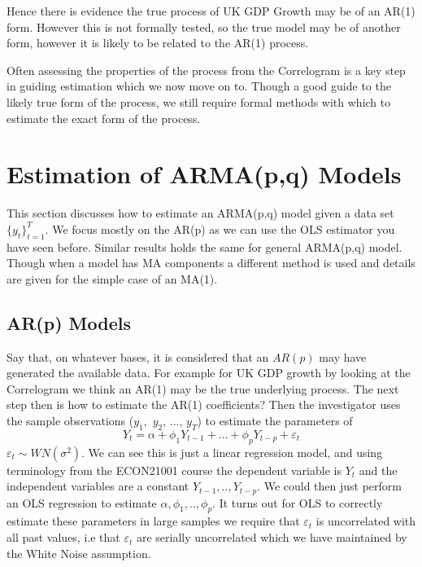 \documentclass[openany]{tufte-book} %
\begin{document}
Hence there is evidence the true process of UK GDP Growth may be of an AR(1) form. However this is not formally tested, so the true model may be of another form, however it is likely to be related to the AR(1) process.

Often assessing the properties of the process from the Correlogram is  a key step in guiding estimation which we now move on to.  Though a good guide to the likely true form of the process,  we still require formal methods with which to estimate the exact form of the process.




\section{Estimation of ARMA(p,q) Models}

This section discusses how to estimate an ARMA(p,q) model given a data set $\{y_t\}_{t=1}^T$. We focus mostly on the AR(p) as we can use the OLS estimator you have seen before. Similar results holds the same for general ARMA(p,q) model. Though when a model has MA components a different method is used and details are given for the simple case of an MA(1).


\subsection{AR(p) Models}

Say that, on whatever bases, it is considered that an $AR(p)$ may have
generated the available data. For example for UK GDP growth by looking at the Correlogram we think an AR(1) may be the true underlying process. The next step then is how to estimate the AR(1) coefficients? Then the investigator uses the sample
observations ($y_{1},$ $y_{2}$, $...$, $y_{T}$) to estimate the parameters
of
\begin{equation}
Y_{t}=\alpha +\phi _{1}Y_{t-1}+...+\phi _{p}Y_{t-p}+\varepsilon _{t}
\label{ARp}
\end{equation}%
 $\varepsilon _{t}\sim WN(\sigma ^{2})$. We can see this is just a linear regression model, and using terminology from the ECON21001 course the dependent variable is $Y_t$ and the independent variables are a constant $Y_{t-1},.., Y_{t-p}$. We could then just perform an OLS regression to estimate $\alpha, \phi_1,..,\phi_p$. It turns out for OLS to correctly estimate these parameters in large samples we require that $\varepsilon _{t}$ is uncorrelated with all past values, i.e that $\varepsilon _{t}$ are serially uncorrelated which we have maintained by the White Noise assumption.
\end{document}
